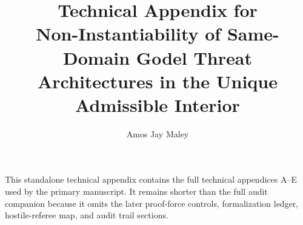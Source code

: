 \documentclass[11pt]{article}
\title{Technical Appendix for\\Non-Instantiability of Same-Domain Godel Threat Architectures in the Unique Admissible Interior}
\author{Amos Jay Maley}
\date{}
\begin{document}
\maketitle

This standalone technical appendix contains the full technical appendices A--E used by the primary manuscript. It remains shorter than the full audit companion because it omits the later proof-force controls, formalization ledger, hostile-referee map, and audit trail sections.

\tableofcontents
\appendix





\end{document}
